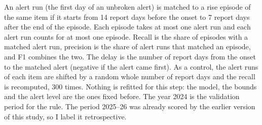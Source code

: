 An alert run (the first day of an unbroken alert) is matched to a rise episode of the same item if it starts from 14 report days before the onset to 7 report days after the end of the episode. Each episode takes at most one alert run and each alert run counts for at most one episode. Recall is the share of episodes with a matched alert run, precision is the share of alert runs that matched an episode, and F1 combines the two. The delay is the number of report days from the onset to the matched alert (negative if the alert came first). As a control, the alert runs of each item are shifted by a random whole number of report days and the recall is recomputed, 300 times. Nothing is refitted for this step: the model, the bounds and the alert level are the ones fixed before. The year 2024 is the validation period for the rule. The period 2025--26 was already scored by the earlier version of this study, so I label it retrospective.
